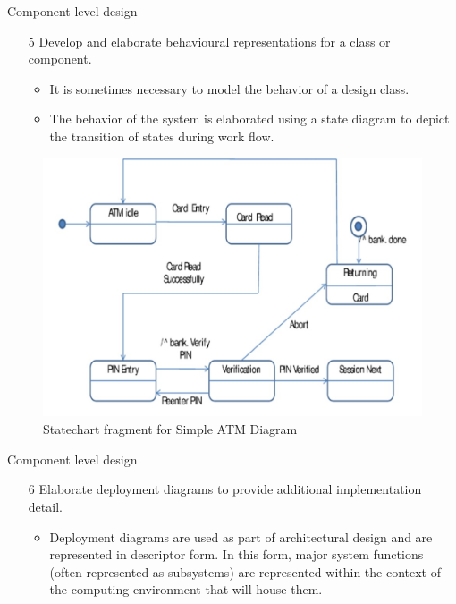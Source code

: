 \documentclass{beamer}
\begin{document}
\begin{frame}{Component level design}
	\begin{itemize}
		\item[5] Develop and elaborate behavioural representations for a class or
		component.
		\begin{itemize}
			\item It is sometimes necessary to model the behavior of a design class.
			\item The behavior of the system is elaborated using a state diagram to depict the transition of 
			states during work flow.
		\end{itemize}
	\end{itemize}	
	
	\begin{figure}
		\includegraphics[scale=.35]{img/m2_52.jpg}
		\caption{Statechart 
			fragment for 
			Simple ATM Diagram }
	\end{figure}
\end{frame}

\begin{frame}{Component level design}
	\begin{itemize}
		\item[6] Elaborate deployment diagrams to provide additional implementation
		detail. 
		\begin{itemize}
			\item Deployment diagrams are used as part of architectural design and are 
			represented in descriptor form. In this form, major system functions (often represented as subsystems) are represented within the context of the computing
			environment that will house them.
		\end{itemize}
	
	\end{itemize}	


\end{frame}
\end{document}
